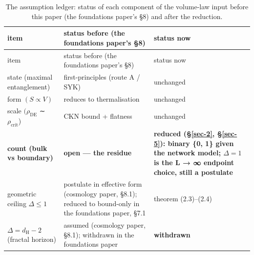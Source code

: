 \documentclass[aps,prd,preprint,nofootinbib,superscriptaddress]{revtex4-2}
\begin{document}
\begin{longtable}[]{@{}
  >{\raggedright\arraybackslash}p{}
  >{\raggedright\arraybackslash}p{}
  >{\raggedright\arraybackslash}p{}@{}}
\caption{The assumption ledger: status of each component of the
volume-law input before this paper (the foundations paper's §8) and
after the reduction.}\tabularnewline
\toprule\noalign{}
\begin{minipage}[b]{\linewidth}\raggedright
item
\end{minipage} & \begin{minipage}[b]{\linewidth}\raggedright
status before (the foundations paper's §8)
\end{minipage} & \begin{minipage}[b]{\linewidth}\raggedright
status now
\end{minipage} \\
\midrule\noalign{}
\endfirsthead
\toprule\noalign{}
\begin{minipage}[b]{\linewidth}\raggedright
item
\end{minipage} & \begin{minipage}[b]{\linewidth}\raggedright
status before (the foundations paper's §8)
\end{minipage} & \begin{minipage}[b]{\linewidth}\raggedright
status now
\end{minipage} \\
\midrule\noalign{}
\endhead
\bottomrule\noalign{}
\endlastfoot
state (maximal entanglement) & first-principles (route A / SYK) &
unchanged \\
form \((S \propto  V)\) & reduces to thermalisation & unchanged \\
scale \((\rho _\mathrm{DE}\) ∼ \(\rho _{\mathrm{crit}}\)) & CKN bound +
flatness & unchanged \\
\textbf{count (bulk vs boundary)} & \textbf{open --- the residue} &
\textbf{reduced (§\ref{sec-2}, §\ref{sec-5}): binary \{0, 1\} given the
network model; \(\Delta  = 1\) is the L → ∞ endpoint choice, still a
postulate} \\
geometric ceiling \(\Delta  \leq  1\) & postulate in effective form
(cosmology paper, §8.1); reduced to bound-only in the foundations paper,
§7.1 & theorem (2.3)--(2.4) \\
\(\Delta  = d_{\mathrm{H}} - 2\) (fractal horizon) & assumed (cosmology
paper, §8.1); withdrawn in the foundations paper & \textbf{withdrawn}

\end{longtable}
\end{document}
